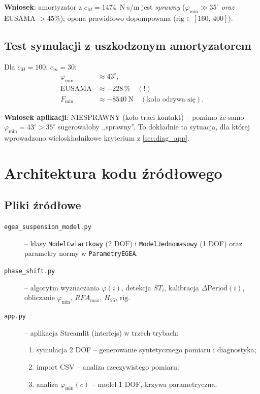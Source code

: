 \documentclass[11pt,a4paper]{article}
\theoremstyle{plainpol}
\begin{document}
\textbf{Wniosek}: amortyzator z $c_M = 1474$~N$\cdot$s/m jest
\emph{sprawny} ($\varphi_{\min} \gg 35^\circ$ \emph{oraz} EUSAMA $> 45$\%);
opona prawidłowo dopompowana ($\mathrm{rig}\in[160,\,400]$).

\subsection{Test symulacji z uszkodzonym amortyzatorem}

Dla $c_M = 100$, $c_m = 30$:
\begin{align}
  \varphi_{\min} &\approx 43^\circ, \\
  \mathrm{EUSAMA} &\approx -228\,\% \quad (!) \\
  F_{\min} &\approx -8540~\mathrm{N} \quad (\text{koło odrywa się}).
\end{align}

\textbf{Wniosek aplikacji}: NIESPRAWNY (koło traci kontakt) -- pomimo
że samo $\varphi_{\min} = 43^\circ > 35^\circ$ sugerowałoby ,,sprawny''.
To dokładnie ta sytuacja, dla której wprowadzono wieloskładnikowe
kryterium z \cref{sec:diag_app}.

\section{Architektura kodu źródłowego}

\subsection{Pliki źródłowe}

\begin{description}
  \item[\texttt{egea\_suspension\_model.py}] -- klasy
    \texttt{ModelCwiartkowy} (2 DOF) i \texttt{ModelJednomasowy} (1 DOF)
    oraz parametry normy w \texttt{ParametryEGEA}.
  \item[\texttt{phase\_shift.py}] -- algorytm wyznaczania $\varphi(i)$,
    detekcja $ST_i$, kalibracja $\Delta\mathrm{Period}(i)$, obliczanie
    $\varphi_{\min}$, $RFA_{\max}$, $H_{25}$, $\mathrm{rig}$.
  \item[\texttt{app.py}] -- aplikacja Streamlit (interfejs) w trzech
    trybach:
    \begin{enumerate}
      \item symulacja 2 DOF -- generowanie syntetycznego pomiaru
        i diagnostyka;
      \item import CSV -- analiza rzeczywistego pomiaru;
      \item analiza $\varphi_{\min}(c)$ -- model 1 DOF, krzywa
        parametryczna.
    \end{enumerate}
\end{description}
\end{document}
